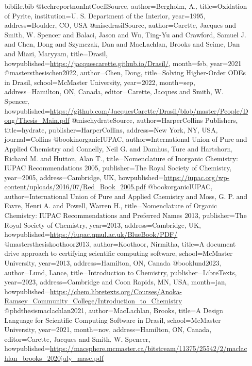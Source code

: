 \documentclass[12pt]{article}
\begin{document}
\begin{filecontents*}{bibfile.bib}
@techreport{nonIntCoeffSource,
author={Bergholm, A.},
title={Oxidation of Pyrite},
institution={U. S. Department of the Interior},
year={1995},
address={Boulder, CO, USA}}
@misc{drasilSource,
author={Carette, Jacques and Smith, W. Spencer and Balaci, Jason and Wu, Ting-Yu and Crawford, Samuel J. and Chen, Dong and Szymczak, Dan and MacLachlan, Brooks and Scime, Dan and Miazi, Maryyam},
title={Drasil},
howpublished={\url{https://jacquescarette.github.io/Drasil/}},
month=feb,
year={2021}}
@mastersthesis{chen2022,
author={Chen, Dong},
title={Solving Higher-Order ODEs in Drasil},
school={McMaster University},
year={2022},
month=sep,
address={Hamilton, ON, Canada},
editor={Carette, Jacques and Smith, W. Spencer},
howpublished={\url{https://github.com/JacquesCarette/Drasil/blob/master/People/Dong/Thesis\_Main.pdf}}}
@misc{hydrateSource,
author={HarperCollins Publishers},
title={hydrate},
publisher={HarperCollins},
address={New York, NY, USA},
journal={Collins}}
@book{inorganicIUPAC,
author={International Union of Pure and Applied Chemistry and Connelly, Neil G. and Damhus, Ture and Hartshorn, Richard M. and Hutton, Alan T.},
title={Nomenclature of Inorganic Chemistry: IUPAC Recommendations 2005},
publisher={The Royal Society of Chemistry},
year={2005},
address={Cambridge, UK},
howpublished={\url{https://iupac.org/wp-content/uploads/2016/07/Red\_Book\_2005.pdf}}}
@book{organicIUPAC,
author={International Union of Pure and Applied Chemistry and Moss, G. P. and Favre, Henri A. and Powell, Warren H.},
title={Nomenclature of Organic Chemistry: IUPAC Recommendations and Preferred Names 2013},
publisher={The Royal Society of Chemistry},
year={2013},
address={Cambridge, UK},
howpublished={\url{https://iupac.qmul.ac.uk/BlueBook/PDF/}}}
@mastersthesis{koothoor2013,
author={Koothoor, Nirmitha},
title={A document drive approach to certifying scientific computing software},
school={McMaster University},
year={2013},
address={Hamilton, ON, Canada}}
@book{lund2023,
author={Lund, Lance},
title={Introduction to Chemistry},
publisher={LibreTexts},
year={2023},
address={Cambridge and Coon Rapids, MN, USA},
month=jan,
howpublished={\url{https://chem.libretexts.org/Courses/Anoka-Ramsey\_Community\_College/Introduction\_to\_Chemistry}}}
@phdthesis{maclachlan2021,
author={MacLachlan, Brooks},
title={A Design Language for Scientific Computing Software in Drasil},
school={McMaster University},
year={2021},
month=nov,
address={Hamilton, ON, Canada},
editor={Carette, Jacques and Smith, W. Spencer},
howpublished={\url{https://macsphere.mcmaster.ca/bitstream/11375/25542/2/maclachlan\_brooks\_2020july\_masc.pdf}}}

\end{filecontents*}
\end{document}
